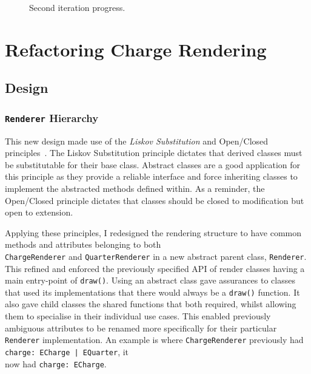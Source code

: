 \documentclass[nobib, a4paper, twoside, justified]{tufte-book}
\begin{document}
\begin{figure}
  \centering
  \qquad
  \caption{Second iteration progress.}%
  \label{fig:second_iteration_progress}
\end{figure}

\section{Refactoring Charge Rendering}%
\label{sec:refactoring_charge_rendering}

\subsection{Design}%
\label{sub:third_design_iteration}

\subsubsection{\texttt{Renderer} Hierarchy}%
\label{ssub:renderer_hierarchy}

This new design made use of the \textit{Liskov Substitution} and Open/Closed
principles~\autocite{martin2000design}. The Liskov Substitution principle dictates that derived
classes must be substitutable for their base class. Abstract classes are a good application for
this principle as they provide a reliable interface and force inheriting classes to implement the
abstracted methods defined within. As a reminder, the Open/Closed principle dictates that classes
should be closed to modification but open to extension.

Applying these principles, I redesigned the rendering structure to have common methods and
attributes belonging to both \\ \texttt{ChargeRenderer} and \texttt{QuarterRenderer} in a new
abstract parent class, \texttt{Renderer}. This refined and enforced the previously specified API of
render classes having a main entry-point of \texttt{draw()}. Using an abstract class gave
assurances to classes that used its implementations that there would always be a \texttt{draw()}
function. It also gave child classes the shared functions that both required, whilst allowing them
to specialise in their individual use cases. This enabled previously ambiguous attributes to be
renamed more specifically for their particular \texttt{Renderer} implementation. An example is
where \texttt{ChargeRenderer} previously had \texttt{charge:~ECharge~|~EQuarter}, it \\ now had
\texttt{charge:~ECharge}.
\end{document}
